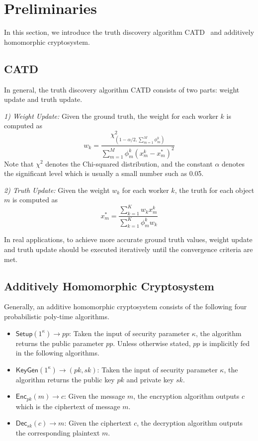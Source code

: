 \documentclass[conference]{IEEEtran}
\begin{document}
\section{Preliminaries}\label{sec4}
In this section, we introduce the truth discovery algorithm CATD~\cite{li_confidence-aware_2014} and additively homomorphic cryptosystem.

\subsection{CATD}
In general, the truth discovery algorithm CATD consists of two parts: weight update and truth update.

\textit{1) Weight Update:} Given the ground truth, the weight for each worker $k$ is computed as
\begin{equation}
w_k = \frac{\chi^2_{(1-\alpha/2,\sum_{m=1}^M \phi_m^k)}}{\sum_{m=1}^M \phi_m^k(x_m^k - x_m^*)^2}
\end{equation}
Note that $\chi^2$ denotes the Chi-squared distribution, and the constant $\alpha$ denotes the significant level which is usually a small number such as 0.05.

\textit{2) Truth Update:} Given the weight $w_k$ for each worker $k$, the truth for each object $m$ is computed as
\begin{equation}
x_m^* = \frac{\sum_{k=1}^K w_k x_m^k}{\sum_{k=1}^K \phi_m^k w_k }
\end{equation}

In real applications, to achieve more accurate ground truth values, weight update and truth update should be executed iteratively until the convergence criteria are met.

\subsection{Additively Homomorphic Cryptosystem}\label{sec4-b}
Generally, an additive homomorphic cryptosystem consists of the following four probabilistic poly-time algorithms.

\begin{itemize}
  \item $\mathsf{Setup}(1^\kappa)\to pp$: Taken the input of security parameter $\kappa$, the algorithm returns the public parameter $pp$. Unless otherwise stated, $pp$ is implicitly fed in the following algorithms.
  \item $\mathsf{KeyGen}(1^\kappa)\to (pk, sk)$: Taken the input of security parameter $\kappa$, the algorithm returns the public key $pk$ and private key $sk$.
  \item $\mathsf{Enc}_{pk}(m)\to c$: Given the message $m$, the encryption algorithm outputs $c$ which is the ciphertext of message $m$.
  \item $\mathsf{Dec}_{sk}(c)\to m$: Given the ciphertext $c$, the decryption algorithm outputs the corresponding plaintext $m$.
\end{itemize}
\end{document}
